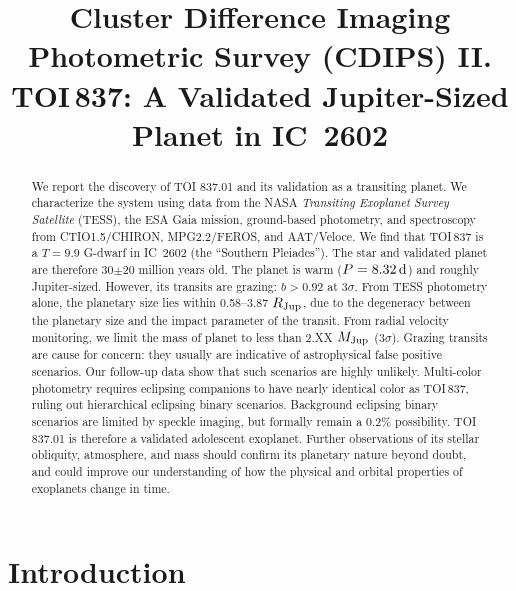 \documentclass[12pt,twocolumn,tighten]{aastex62}
\begin{document}

\title{
  Cluster Difference Imaging Photometric Survey (CDIPS) II.
  TOI$\,$837: A Validated Jupiter-Sized Planet in IC~2602
}



\begin{abstract}
  We report the discovery of TOI 837.01 and its validation as a
  transiting planet.  We characterize the system using data from the
  NASA {\it Transiting Exoplanet Survey Satellite} (TESS), the ESA
  Gaia mission, ground-based photometry, and spectroscopy from
  CTIO1.5/CHIRON, MPG2.2/FEROS, and AAT/Veloce.  We find that
  TOI$\,$837 is a $T=9.9$ G-dwarf in IC~2602 (the ``Southern
  Pleiades'').  The star and validated planet are therefore 30$\pm$20
  million years old.  The planet is warm ($P = 8.32\,{\rm d}$) and
  roughly Jupiter-sized.  However, its transits are grazing: $b >
  0.92$ at 3$\sigma$.  From TESS photometry alone, the planetary size
  lies within 0.58--3.87 $R_{\rm Jup}$, due to the degeneracy between
  the planetary size and the impact parameter of the transit.  From
  radial velocity monitoring, we limit the mass of planet to less than
  2.XX $M_{\rm Jup}$ (3$\sigma$).  Grazing transits are cause for
  concern: they usually are indicative of astrophysical false
  positive scenarios.  Our follow-up data show that such scenarios are
  highly unlikely.  Multi-color photometry requires eclipsing
  companions to have nearly identical color as TOI$\,$837, ruling out
  hierarchical eclipsing binary scenarios.  Background eclipsing
  binary scenarios are limited by speckle imaging, but formally remain
  a 0.2\% possibility.  TOI 837.01 is therefore a validated adolescent
  exoplanet.  Further observations of its stellar obliquity,
  atmosphere, and mass should confirm its planetary nature beyond
  doubt, and could improve our understanding of how the physical and
  orbital properties of exoplanets change in time.
\end{abstract}




\section{Introduction}
\end{document}
